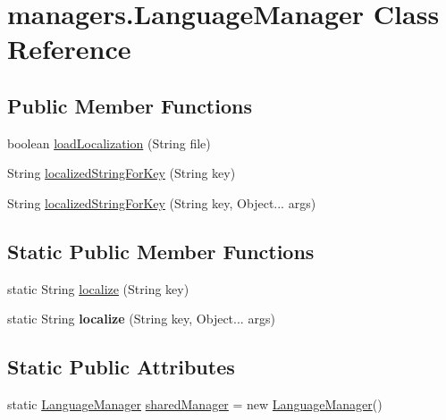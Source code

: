 \hypertarget{classmanagers_1_1_language_manager}{}\section{managers.\+Language\+Manager Class Reference}
\label{classmanagers_1_1_language_manager}
\subsection*{Public Member Functions}
\begin{DoxyCompactItemize}
\item 
boolean \hyperlink{classmanagers_1_1_language_manager_a7275543f3fe96b06cf48ed07786588bf}{load\+Localization} (String file)
\item 
String \hyperlink{classmanagers_1_1_language_manager_a70aa7056418a9c75be339d0c7cfeb6df}{localized\+String\+For\+Key} (String key)
\item 
String \hyperlink{classmanagers_1_1_language_manager_af9223db14b4e35c239123b9d0d67aee3}{localized\+String\+For\+Key} (String key, Object... args)
\end{DoxyCompactItemize}
\subsection*{Static Public Member Functions}
\begin{DoxyCompactItemize}
\item 
static String \hyperlink{classmanagers_1_1_language_manager_ab18faff3b75679e2b6baf4055aa1cb75}{localize} (String key)
\item 
\mbox{\label{classmanagers_1_1_language_manager_a69fb8b0be7d245ecdafa3442cd98495f}} 
static String {\bfseries localize} (String key, Object... args)
\end{DoxyCompactItemize}
\subsection*{Static Public Attributes}
\begin{DoxyCompactItemize}
\item 
static \hyperlink{classmanagers_1_1_language_manager}{Language\+Manager} \hyperlink{classmanagers_1_1_language_manager_aa1f02355178163bb91caaac9cce4cb7c}{shared\+Manager} = new \hyperlink{classmanagers_1_1_language_manager}{Language\+Manager}()
\end{DoxyCompactItemize}


